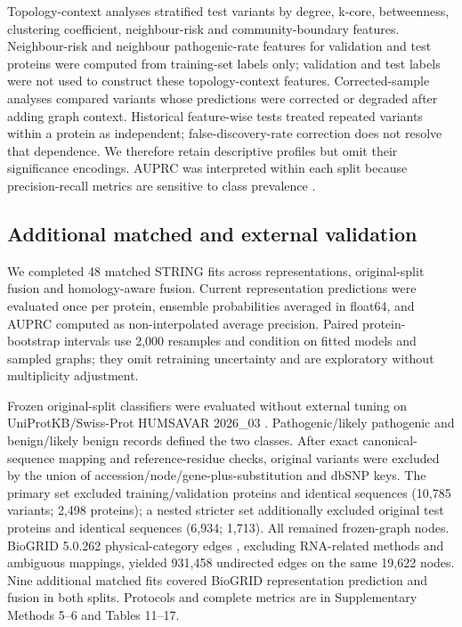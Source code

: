 \documentclass[conference]{IEEEtran}
\begin{document}
Topology-context analyses stratified test variants by degree, k-core, betweenness, clustering coefficient, neighbour-risk and community-boundary features. Neighbour-risk and neighbour pathogenic-rate features for validation and test proteins were computed from training-set labels only; validation and test labels were not used to construct these topology-context features. Corrected-sample analyses compared variants whose predictions were corrected or degraded after adding graph context. Historical feature-wise tests treated repeated variants within a protein as independent; false-discovery-rate correction \cite{Benjamini1995FDR} does not resolve that dependence. We therefore retain descriptive profiles but omit their significance encodings. AUPRC was interpreted within each split because precision-recall metrics are sensitive to class prevalence \cite{Saito2015PrecisionRecall}.


\subsection{Additional matched and external validation}

We completed 48 matched STRING fits across representations, original-split fusion and homology-aware fusion. Current representation predictions were evaluated once per protein, ensemble probabilities averaged in float64, and AUPRC computed as non-interpolated average precision. Paired protein-bootstrap intervals use 2,000 resamples and condition on fitted models and sampled graphs; they omit retraining uncertainty and are exploratory without multiplicity adjustment.

Frozen original-split classifiers were evaluated without external tuning on UniProtKB/\allowbreak{}Swiss-Prot HUMSAVAR 2026\_03 \cite{UniProt2025}. Pathogenic/likely pathogenic and benign/likely benign records defined the two classes. After exact canonical-sequence mapping and reference-residue checks, original variants were excluded by the union of accession/node/gene-plus-substitution and dbSNP keys. The primary set excluded training/validation proteins and identical sequences (10,785 variants; 2,498 proteins); a nested stricter set additionally excluded original test proteins and identical sequences (6,934; 1,713). All remained frozen-graph nodes. BioGRID 5.0.262 physical-category edges \cite{Stark2006BioGRID}, excluding RNA-related methods and ambiguous mappings, yielded 931,458 undirected edges on the same 19,622 nodes. Nine additional matched fits covered BioGRID representation prediction and fusion in both splits. Protocols and complete metrics are in Supplementary Methods 5--6 and Tables 11--17.
\end{document}
